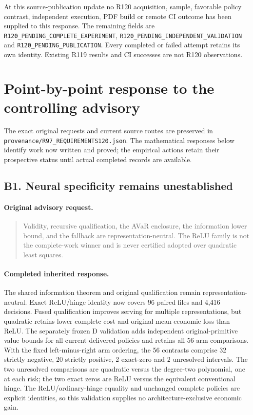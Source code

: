 At this source-publication update no R120 acquisition, sample, favorable
policy contrast, independent execution, PDF build or remote CI outcome
has been supplied to this response. The remaining fields are
\texttt{R120\_PENDING\_COMPLETE\_EXPERIMENT},
\texttt{R120\_PENDING\_INDEPENDENT\_VALIDATION} and
\texttt{R120\_PENDING\_PUBLICATION}. Every completed or failed attempt
retains its own identity. Existing R119 results and CI successes are not
R120 observations.

\section{Point-by-point response to the controlling advisory}
The exact original requests and current source routes are preserved in
\nolinkurl{provenance/R97_REQUIREMENTS120.json}. The mathematical responses
below identify work now written and proved; the empirical actions retain
their prospective status until actual completed records are available.

\subsection{B1. Neural specificity remains unestablished}
\label{response120:B1}
\paragraph{Original advisory request.}
\begin{quote}
Validity, recursive qualification, the AVaR enclosure, the information lower bound, and the fallback are representation-neutral. The ReLU family is not the complete-work winner and is never certified adopted over quadratic least squares.
\end{quote}
\paragraph{Completed inherited response.}
The shared information theorem and original qualification remain representation-neutral. Exact ReLU/hinge identity now covers 96 paired files and 4,416 decisions. Fused qualification improves serving for multiple representations, but quadratic retains lower complete cost and original mean economic loss than ReLU. The separately frozen D validation adds independent original-primitive value bounds for all current delivered policies and retains all 56 arm comparisons. With the fixed left-minus-right arm ordering, the 56 contrasts comprise 32 strictly negative, 20 strictly positive, 2 exact-zero and 2 unresolved intervals. The two unresolved comparisons are quadratic versus the degree-two polynomial, one at each risk; the two exact zeros are ReLU versus the equivalent conventional hinge. The ReLU/ordinary-hinge equality and unchanged complete policies are explicit identities, so this validation supplies no architecture-exclusive economic gain.
